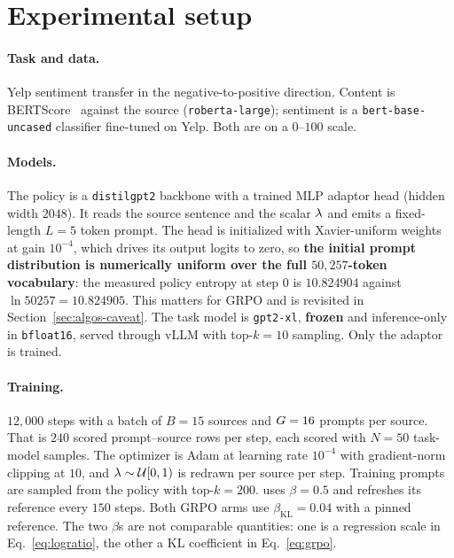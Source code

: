 \section{Experimental setup}
\label{sec:setup-exp}

\paragraph{Task and data.}
Yelp sentiment transfer in the negative-to-positive direction. Content is
BERTScore~\citep{zhang2020bertscore} against the source (\texttt{roberta-large});
sentiment is a \texttt{bert-base-uncased} classifier fine-tuned on Yelp. Both
are on a $0$--$100$ scale.

\paragraph{Models.}
The policy is a \texttt{distilgpt2} backbone with a trained MLP adaptor head
(hidden width $2048$). It reads the source sentence and the scalar $\lambda$ and
emits a fixed-length $L=5$ token prompt. The head is initialized with
Xavier-uniform weights at gain $10^{-4}$, which drives its output logits to
zero, so \textbf{the initial prompt distribution is numerically uniform over
the full $50{,}257$-token vocabulary}: the measured policy entropy at step $0$
is $10.824904$ against $\ln 50257 = 10.824905$. This matters for GRPO and is
revisited in Section~\ref{sec:algos-caveat}. The task model is
\texttt{gpt2-xl}, \textbf{frozen} and inference-only in \texttt{bfloat16},
served through vLLM with top-$k=10$ sampling. Only the adaptor is trained.

\paragraph{Training.}
$12{,}000$ steps with a batch of $B=15$ sources and $G=16$ prompts per
source. That is $240$ scored prompt--source rows per step, each scored with
$N=50$ task-model samples. The optimizer is Adam at learning rate $10^{-4}$
with gradient-norm clipping at $10$, and $\lambda \sim \mathcal{U}[0,1)$ is
redrawn per source per step. Training prompts are sampled from the policy with
top-$k=200$. \rrebel{} uses $\beta = 0.5$ and refreshes its reference every
$150$ steps. Both GRPO arms use $\beta_{\mathrm{KL}} = 0.04$ with a pinned
reference. The two $\beta$s are not comparable quantities: one is a regression
scale in Eq.~\eqref{eq:logratio}, the other a KL coefficient in
Eq.~\eqref{eq:grpo}.


